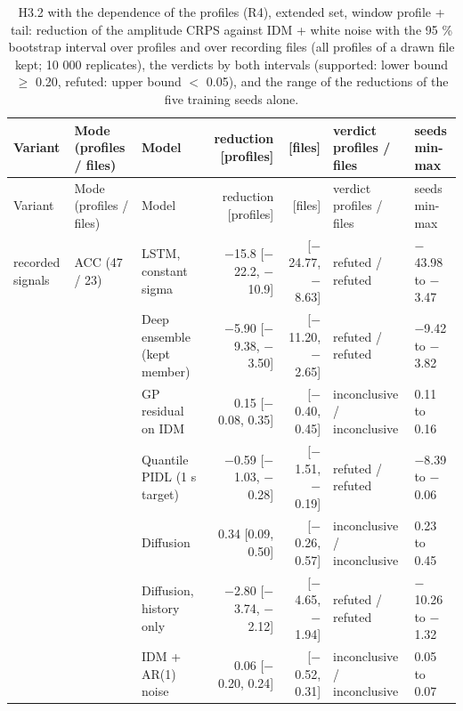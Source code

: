 \begingroup
\footnotesize
\begin{longtable}{lllrrll}
\caption{H3.2 with the dependence of the profiles (R4), extended set, window profile + tail: reduction of the amplitude CRPS against IDM + white noise with the 95 \% bootstrap interval over profiles and over recording files (all profiles of a drawn file kept; 10 000 replicates), the verdicts by both intervals (supported: lower bound $\geq$ 0.20, refuted: upper bound $<$ 0.05), and the range of the reductions of the five training seeds alone.}\label{tab:t5-h32-cluster--e3} \\
\toprule
Variant & Mode (profiles / files) & Model & reduction [profiles] & [files] & verdict profiles / files & seeds min-max \\
\midrule
\endfirsthead
\toprule
Variant & Mode (profiles / files) & Model & reduction [profiles] & [files] & verdict profiles / files & seeds min-max \\
\midrule
\endhead
\bottomrule
\endlastfoot
recorded signals & ACC (47 / 23) & LSTM, constant sigma & $-$15.8 [$-$22.2, $-$10.9] & [$-$24.77, $-$8.63] & refuted / refuted & $-$43.98 to $-$3.47 \\
 &  & Deep ensemble (kept member) & $-$5.90 [$-$9.38, $-$3.50] & [$-$11.20, $-$2.65] & refuted / refuted & $-$9.42 to $-$3.82 \\
 &  & GP residual on IDM & 0.15 [$-$0.08, 0.35] & [$-$0.40, 0.45] & inconclusive / inconclusive & 0.11 to 0.16 \\
 &  & Quantile PIDL (1 s target) & $-$0.59 [$-$1.03, $-$0.28] & [$-$1.51, $-$0.19] & refuted / refuted & $-$8.39 to $-$0.06 \\
 &  & Diffusion & 0.34 [0.09, 0.50] & [$-$0.26, 0.57] & inconclusive / inconclusive & 0.23 to 0.45 \\
 &  & Diffusion, history only & $-$2.80 [$-$3.74, $-$2.12] & [$-$4.65, $-$1.94] & refuted / refuted & $-$10.26 to $-$1.32 \\
 &  & IDM + AR(1) noise & 0.06 [$-$0.20, 0.24] & [$-$0.52, 0.31] & inconclusive / inconclusive & 0.05 to 0.07 \\

\end{longtable}
